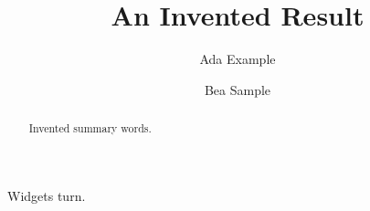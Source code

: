 \documentclass{inventedams}
\begin{document}
\title{An Invented Result}
\author{Ada Example}
\author{Bea Sample}
\begin{abstract}Invented summary words.\end{abstract}
\maketitle
Widgets turn.
\end{document}

